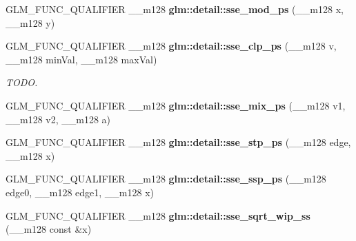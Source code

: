 \begin{DoxyCompactItemize}
\item 
\hypertarget{namespaceglm_1_1detail_a5a9835edaca654da44c7daae89ce5106}{}G\+L\+M\+\_\+\+F\+U\+N\+C\+\_\+\+Q\+U\+A\+L\+I\+F\+I\+E\+R \+\_\+\+\_\+m128 {\bfseries glm\+::detail\+::sse\+\_\+mod\+\_\+ps} (\+\_\+\+\_\+m128 x, \+\_\+\+\_\+m128 y)\label{namespaceglm_1_1detail_a5a9835edaca654da44c7daae89ce5106}

\item 
\hypertarget{namespaceglm_1_1detail_a7449dbce48a49880189874273179f3d2}{}G\+L\+M\+\_\+\+F\+U\+N\+C\+\_\+\+Q\+U\+A\+L\+I\+F\+I\+E\+R \+\_\+\+\_\+m128 {\bfseries glm\+::detail\+::sse\+\_\+clp\+\_\+ps} (\+\_\+\+\_\+m128 v, \+\_\+\+\_\+m128 min\+Val, \+\_\+\+\_\+m128 max\+Val)\label{namespaceglm_1_1detail_a7449dbce48a49880189874273179f3d2}

\begin{DoxyCompactList}\small\item\em T\+O\+D\+O. \end{DoxyCompactList}\item 
\hypertarget{namespaceglm_1_1detail_af1b5b805a3dd439d6fbe92033f4d3bbd}{}G\+L\+M\+\_\+\+F\+U\+N\+C\+\_\+\+Q\+U\+A\+L\+I\+F\+I\+E\+R \+\_\+\+\_\+m128 {\bfseries glm\+::detail\+::sse\+\_\+mix\+\_\+ps} (\+\_\+\+\_\+m128 v1, \+\_\+\+\_\+m128 v2, \+\_\+\+\_\+m128 a)\label{namespaceglm_1_1detail_af1b5b805a3dd439d6fbe92033f4d3bbd}

\item 
\hypertarget{namespaceglm_1_1detail_a7287773c37d9f5900db40f7a783f689c}{}G\+L\+M\+\_\+\+F\+U\+N\+C\+\_\+\+Q\+U\+A\+L\+I\+F\+I\+E\+R \+\_\+\+\_\+m128 {\bfseries glm\+::detail\+::sse\+\_\+stp\+\_\+ps} (\+\_\+\+\_\+m128 edge, \+\_\+\+\_\+m128 x)\label{namespaceglm_1_1detail_a7287773c37d9f5900db40f7a783f689c}

\item 
\hypertarget{namespaceglm_1_1detail_a66b096ea09da5b585484550d41da1580}{}G\+L\+M\+\_\+\+F\+U\+N\+C\+\_\+\+Q\+U\+A\+L\+I\+F\+I\+E\+R \+\_\+\+\_\+m128 {\bfseries glm\+::detail\+::sse\+\_\+ssp\+\_\+ps} (\+\_\+\+\_\+m128 edge0, \+\_\+\+\_\+m128 edge1, \+\_\+\+\_\+m128 x)\label{namespaceglm_1_1detail_a66b096ea09da5b585484550d41da1580}

\item 
G\+L\+M\+\_\+\+F\+U\+N\+C\+\_\+\+Q\+U\+A\+L\+I\+F\+I\+E\+R \+\_\+\+\_\+m128 {\bfseries glm\+::detail\+::sse\+\_\+sqrt\+\_\+wip\+\_\+ss} (\+\_\+\+\_\+m128 const \&x)
\end{DoxyCompactItemize}
